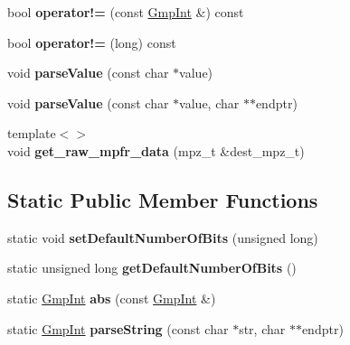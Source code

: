 \begin{DoxyCompactItemize}
bool {\bfseries operator!=} (const \hyperlink{class_gmp_int}{Gmp\+Int} \&) const
\item 
\mbox{\label{class_gmp_int_ad6fdbfa0ad3ec0d324b0aa6879b8d6c1}} 
bool {\bfseries operator!=} (long) const
\item 
\mbox{\label{class_gmp_int_a92a41d198711c2896d2ae7bca42209de}} 
void {\bfseries parse\+Value} (const char $\ast$value)
\item 
\mbox{\label{class_gmp_int_a79947383c9f80c0867057bbba74cc59a}} 
void {\bfseries parse\+Value} (const char $\ast$value, char $\ast$$\ast$endptr)
\item 
\mbox{\label{class_gmp_int_ad68c096721eca70fb9ed0f82513008b3}} 
{\footnotesize template$<$$>$ }\\void {\bfseries get\+\_\+raw\+\_\+mpfr\+\_\+data} (mpz\+\_\+t \&dest\+\_\+mpz\+\_\+t)
\end{DoxyCompactItemize}
\subsection*{Static Public Member Functions}
\begin{DoxyCompactItemize}
\item 
\mbox{\label{class_gmp_int_a273ae97f8f05b7f9cd01ab5eea9153fc}} 
static void {\bfseries set\+Default\+Number\+Of\+Bits} (unsigned long)
\item 
\mbox{\label{class_gmp_int_a23c5d1a57e1bd9c4415840ed84a3bc6d}} 
static unsigned long {\bfseries get\+Default\+Number\+Of\+Bits} ()
\item 
\mbox{\label{class_gmp_int_aaeb789d48d137fb5c33bf649187e8b55}} 
static \hyperlink{class_gmp_int}{Gmp\+Int} {\bfseries abs} (const \hyperlink{class_gmp_int}{Gmp\+Int} \&)
\item 
\mbox{\label{class_gmp_int_a5e0da7c2ee351f008be6508fd9011451}} 
static \hyperlink{class_gmp_int}{Gmp\+Int} {\bfseries parse\+String} (const char $\ast$str, char $\ast$$\ast$endptr)
\end{DoxyCompactItemize}
